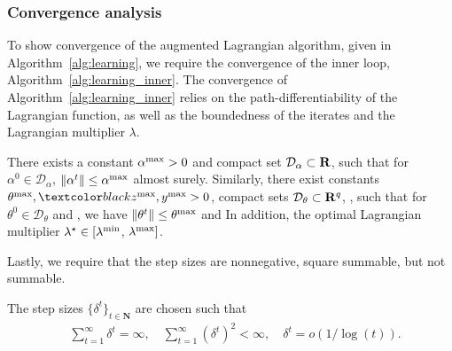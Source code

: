 

\subsubsection{Convergence analysis}
\label{sec:convergence_analysis}
To show convergence of the augmented Lagrangian algorithm, given in Algorithm~\ref{alg:learning}, we require the convergence of the inner loop, Algorithm~\ref{alg:learning_inner}. 
The convergence of Algorithm~\ref{alg:learning_inner} relies on the path-differentiability of the Lagrangian function, as well as the boundedness of the iterates and the Lagrangian multiplier $\lambda$.
\begin{assumption}[Boundedness]
\label{ass:bounded}
There exists a constant $\alpha^{\rm max} > 0$ and compact set $\mathcal{D}_{\alpha} \subset {\mathbf R}$, such that for $\alpha^0 \in  \mathcal{D}_{\alpha}$, $\|\alpha^t\| \leq \alpha^{\rm max}$  almost surely.
Similarly, there exist constants $\theta^{\rm max},\RC{z^{\rm max}}, y^{\rm max} > 0$, compact sets $\mathcal{D}_{\theta} \subset {\mathbf R}^{q}$, , such that for $\theta^0 \in \mathcal{D}_{\theta}$ and , we have $\|\theta^t\| \leq \theta^{\rm max}$ and 
In addition, the optimal Lagrangian multiplier $\lambda^\star \in [\lambda^{\rm{min}}$, $\lambda^{\rm{max}}]$.
\end{assumption}
Lastly, we require that the step sizes are nonnegative, square summable, but not summable.
\begin{assumption}
\label{ass:step_size}
The step sizes $\{\delta^t\}_{t \in \mathbf{N}}$ are chosen such that
\begin{align*}
   &\sum_{t=1}^\infty \delta^t = \infty, \quad \sum_{t=1}^\infty (\delta^t)^2 < \infty,\quad \delta^t = o(1/\log(t)).
\end{align*}
\end{assumption}
